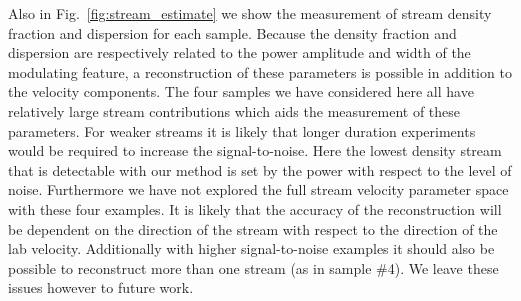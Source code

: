 Also in Fig.~\ref{fig:stream_estimate} we show the measurement of stream density fraction and dispersion for each sample. Because the density fraction and dispersion are respectively related to the power amplitude and width of the modulating feature, a reconstruction of these parameters is possible in addition to the velocity components. The four samples we have considered here all have relatively large stream contributions which aids the measurement of these parameters. For weaker streams it is likely that longer duration experiments would be required to increase the signal-to-noise. Here the lowest density stream that is detectable with our method is set by the power with respect to the level of noise. Furthermore we have not explored the full stream velocity parameter space with these four examples. It is likely that the accuracy of the reconstruction will be dependent on the direction of the stream with respect to the direction of the lab velocity. Additionally with higher signal-to-noise examples it should also be possible to reconstruct more than one stream (as in sample \#4). We leave these issues however to future work.



